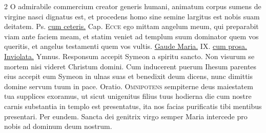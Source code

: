 \begin{multicols*}{2}
{\color{Red} }
 O admirabile commercium creator generis humani, animatum corpus sumens de virgine nasci dignatus est, et procedens homo sine semine largitus est nobis suam deitatem. {\color{Red} Ps.}  \ul{cum ceteris.} {\color{Red} Cap.}
\lettrine[lines=2]{\zallmancaps \color{Red} E}{cce} ego mittam angelum meum, qui preparabit viam ante faciem meam, et statim veniet ad templum suum dominator quem vos queritis, et angelus testamenti quem vos vultis. \R \hyperlink{gaude-maria-virgo}{Gaude Maria.} {\color{Red} IX.} \ul{cum prosa.} \hyperlink{inviolata-intacta-prosa}{Inviolata.} {\color{Red} Ymnus.}
\newline \V Responsum accepit Symeon a spiritu sancto. \R Non visurum se mortem nisi videret Christum domini.
 Cum inducerent puerum Ihesum parentes eius accepit eum Symeon in ulnas suas et benedixit deum dicens, nunc dimittis domine servum tuum in pace. {\color{Red} Oratio.}
\lettrine[lines=2]{\zallmancaps \color{Red} O}{mnipotens} sempiterne deus maiestatem tua supplices exoramus, ut sicut unigenitus filius tuus hodierna die cum nostre carnis substantia in templo est presentatus, ita nos facias purificatis tibi mentibus presentari. Per eundem.
 Sancta dei genitrix virgo semper Maria intercede pro nobis ad dominum deum nostrum.

\end{multicols*}
